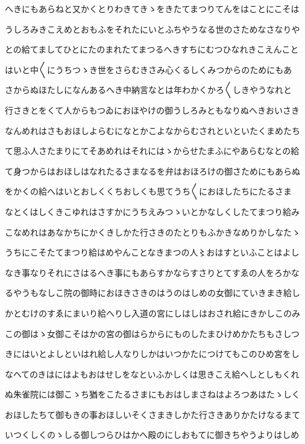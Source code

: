 \documentclass[a4paper,11pt,landscape]{ltjtarticle}
\begin{document}
へきにもあらねと又かくとりわきてきゝをきたてまつりてんをはことにこそは
\par\medskip
うしろみきこえめとおもふをそれたにいとふちやうなる世のさためなさなりや
\par\medskip
との給てましてひとにたのまれたてまつるへきすちにむつひなれきこえんこと
\par\medskip
はいと中〱にうちつゝき世をさらむきさみ心くるしくみつからのためにもあ
\par\medskip
さからぬほたしになんあるへき中納言なとは年わかくかろ〱しきやうなれと
\par\medskip
行さきとをくて人からもつゐにおほやけの御うしろみともなりぬへきおいさき
\par\medskip
なんめれはさもおほしよらむになとかこよなからむされといといたくまめたち
\par\medskip
て思ふ人さたまりにてそあめれはそれにはゝからせたまふにやあらむなとの給
\par\medskip
て身つからはおほしはなれたるさまなるを弁はおほろけの御さためにもあらぬ
\par\medskip
をかくの給へはいとおしくくちおしくも思てうち〱におほしたちにたるさま
\par\medskip
なとくはしくきこゆれはさすかにうちえみつゝいとかなしくしたてまつり給み
\par\medskip
こなめれはあなかちにかくきしかた行さきのたとりもふかきなめりかしなたゝ
\par\medskip
うちにこそたてまつり給はめやんことなきまつの人〻おはすといふことはよし
\par\medskip
なき事なりそれにさはるへき事にもあらすかならすさりとてすゑの人をろかな
\par\medskip
るやうもなしこ院の御時におほきさきのはうのはしめの女御にていきまき給し
\par\medskip
かとむけのすゑにまいり給へりし入道の宮にしはしはおされ給にきかしこのみ
\par\medskip
この御はゝ女御こそはかの宮の御はらからにものしたまひけめかたちもさしつ
\par\medskip
きにはいとよしといはれ給し人なりしかはいつかたにつけてもこのひめ宮をし
\par\medskip
なへてのきはにはよもおはせしをなといふかしくは思きこえ給へしとしもくれ
\par\medskip
ぬ朱雀院には御こゝち猶をこたるさまにもおはしまさねはよろつあはたゝしく
\par\medskip
おほしたちて御もきの事おほしいそくさまきしかた行さきありかたけなるまて
\par\medskip
いつくしくのゝしる御しつらひはかへ殿のにしおもてに御きちやうよりはしめ
\end{document}
